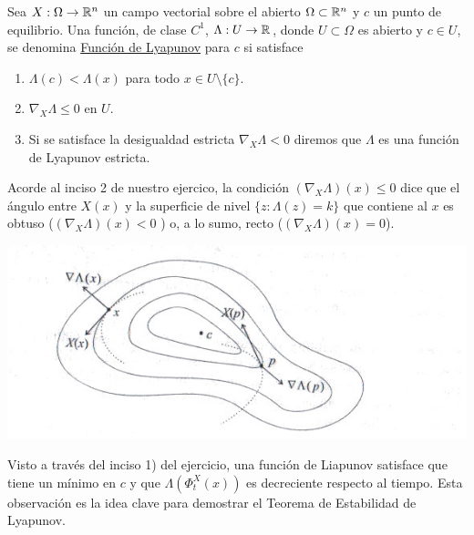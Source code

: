 \begin{definicion}{}
               Sea $X:\Omega\to\mathbb{R}^n$ un campo vectorial sobre el abierto $\Omega\subset\mathbb{R}^n$ y $c$ un punto de equilibrio.
               Una función, de clase $C^1$, $\Lambda:U\to\mathbb{R}$, donde $U\subset\Omega$ es  abierto y $c\in U$, se denomina
               \href{http://es.wikipedia.org/wiki/Función_de_Lyapunov}{Función de Lyapunov} para $c$ si satisface
               \begin{enumerate}
                 \item $\Lambda(c)<\Lambda(x)$ para todo $x\in U\setminus\{c\}$.
                 \item $\nabla_X\Lambda\leq 0$ en $U$.
                 \item Si se satisface la desigualdad estricta $\nabla_X\Lambda< 0$ diremos que $\Lambda$ es una 
                función de Lyapunov estricta.
               \end{enumerate}
\end{definicion}

              
  Acorde al inciso 2 de nuestro ejercico, la condición $(\nabla_X\Lambda)(x)\leq 0$ dice que el ángulo entre $X(x)$ 
 y la superficie  de nivel $\{z:\Lambda(z)=k\}$ que contiene al $x$ es obtuso ($(\nabla_X\Lambda)(x)<0$ ) 
 o, a lo sumo, recto ($(\nabla_X\Lambda)(x)=0$). 
 
   \begin{center}
   \includegraphics[scale=0.5]{imagenes/liapunov.jpg}
   \end{center}




  Visto a través del inciso 1) del ejercicio, una función de Liapunov satisface que tiene un mínimo en $c$ 
 y que $\Lambda(\Phi_t^X(x))$ es decreciente respecto al tiempo.  Esta observación es la idea clave para demostrar el Teorema de Estabilidad de Lyapunov.


